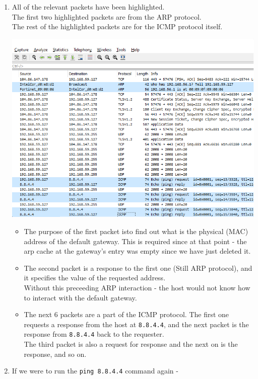 \begin{enumerate}[label=\alph*.]
	\item All of the relevant packets have been highlighted.\\
	The first two highlighted packets are from the ARP protocol.\\
	The rest of the highlighted packets are for the ICMP protocol itself.
	\begin{center}
		\includegraphics[width=1.2 \textwidth]{Resources/del_arp_cache.png}\centering
	\end{center}
	\begin{itemize}
		\item The purpose of the first packet isto find out what is the physical (MAC) address
		of the default gateway. This is required since at that point - the 
		arp cache at the gateway's entry was empty since we have just deleted it.
		\item The second packet is a response to the first one (Still ARP protocol), and it 
		specifies the value of the requested address.\\
		Without this preceeding ARP interaction - the host would not know
		how to interact with the default gateway.
		\item The next 6 packets are a part of the ICMP protocol. The 
		first one requests a response from the host at \texttt{8.8.4.4},
		and the next packet is the response from \texttt{8.8.4.4} back to the requester.\\
		The third packet is also a request for response and the next on is the response, and so on.
	\end{itemize}
	\item If we were to run the \texttt{ping 8.8.4.4} command again - 

\end{enumerate}
